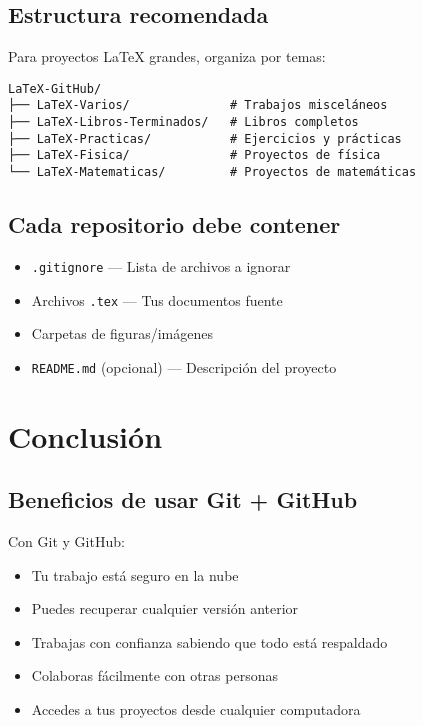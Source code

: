 \documentclass[11pt,a4paper]{article}
\begin{document}
\subsection{Estructura recomendada}

Para proyectos LaTeX grandes, organiza por temas:

\begin{lstlisting}[style=bashstyle]
LaTeX-GitHub/
├── LaTeX-Varios/              # Trabajos misceláneos
├── LaTeX-Libros-Terminados/   # Libros completos
├── LaTeX-Practicas/           # Ejercicios y prácticas
├── LaTeX-Fisica/              # Proyectos de física
└── LaTeX-Matematicas/         # Proyectos de matemáticas
\end{lstlisting}

\subsection{Cada repositorio debe contener}

\begin{itemize}
  \item \texttt{.gitignore} --- Lista de archivos a ignorar
  \item Archivos \texttt{.tex} --- Tus documentos fuente
  \item Carpetas de figuras/imágenes
  \item \texttt{README.md} (opcional) --- Descripción del proyecto
\end{itemize}

\section{Conclusión}

\subsection{Beneficios de usar Git + GitHub}

\begin{successbox}
Con Git y GitHub:
\begin{itemize}
  \item Tu trabajo está seguro en la nube
  \item Puedes recuperar cualquier versión anterior
  \item Trabajas con confianza sabiendo que todo está respaldado
  \item Colaboras fácilmente con otras personas
  \item Accedes a tus proyectos desde cualquier computadora
\end{itemize}
\end{successbox}
\end{document}
